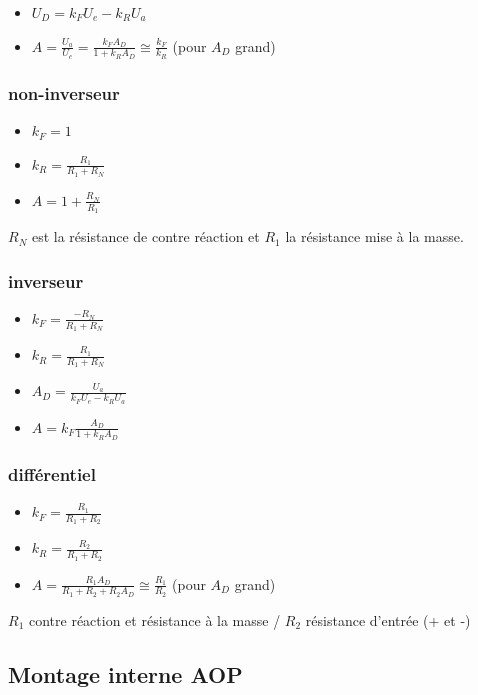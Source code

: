 \documentclass[resume]{subfiles}
\begin{document}
\begin{multicols}{3}
\begin{itemize}
\item $U_D = k_FU_e - k_RU_a$
\item $A = \frac{U_a}{U_e} = \frac{k_FA_D}{1+k_RA_D} \cong \frac{k_F}{k_R}$ (pour $A_D$ grand) 
\end{itemize}

\subsubsection{non-inverseur}
\begin{itemize}
\item $k_F = 1$
\item $k_R = \frac{R_1}{R_1+R_N}$
\item $A = 1+\frac{R_N}{R_1}$
\end{itemize}
$R_N$ est la résistance de contre réaction et $R_1$ la résistance mise à la masse.

\subsubsection{inverseur}
\begin{itemize}
\item $k_F = \frac{-R_N}{R_1+R_N}$
\item $k_R = \frac{R_1}{R_1+R_N}$
\item $A_D = \frac{U_a}{k_FU_e-k_RU_a}$
\item $A = k_F\frac{A_D}{1+k_RA_D}$
\end{itemize}

\subsubsection{différentiel}
\begin{itemize}
\item $k_F = \frac{R_1}{R_1+R_2}$
\item $k_R = \frac{R_2}{R_1+R_2}$
\item $A = \frac{R_1A_D}{R_1+R_2+R_2A_D} \cong \frac{R_1}{R_2}$ (pour $A_D$ grand)
\end{itemize}
$R_1$ contre réaction et résistance à la masse / $R_2$ résistance d'entrée (+ et -)

\subsection{Montage interne AOP}

\end{multicols}
\end{document}
